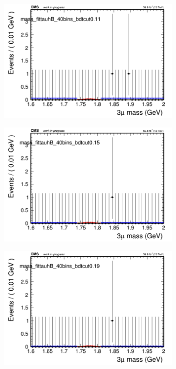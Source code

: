 \begin{figure}[H]
\begin{subfigure}{0.2\textwidth}
        \caption{}
    \end{subfigure}
    \begin{subfigure}{0.2\textwidth}
        \includegraphics[width=\textwidth]{flat_fit/plots/tauhB/massfit_tauhB_40bins_bdtcut0.11.png}
        \caption{}
    \end{subfigure}
    \begin{subfigure}{0.2\textwidth}
        \includegraphics[width=\textwidth]{flat_fit/plots/tauhB/massfit_tauhB_40bins_bdtcut0.15.png}
        \caption{}
    \end{subfigure}
    \begin{subfigure}{0.2\textwidth}
        \includegraphics[width=\textwidth]{flat_fit/plots/tauhB/massfit_tauhB_40bins_bdtcut0.19.png}

\end{subfigure}
\end{figure}
